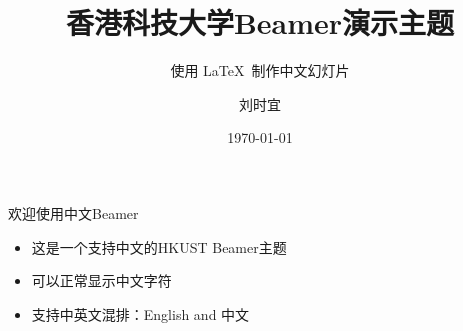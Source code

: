 \documentclass[10pt,aspectratio=169]{beamer}
\title{香港科技大学Beamer演示主题}
\subtitle{使用 \LaTeX\ 制作中文幻灯片}
\author{刘时宜}
\institute[ECE]{电子与计算机工程学系}
\date{\today}
\begin{document}

\maketitle %

\begin{frame}{欢迎使用中文Beamer}
    \begin{itemize}
        \item 这是一个支持中文的HKUST Beamer主题
        \item 可以正常显示中文字符
        \item 支持中英文混排：English and 中文
    \end{itemize}
\end{frame}





\backmatter


\end{document}
